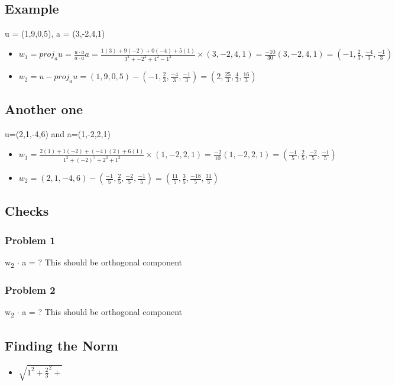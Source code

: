 \documentclass[11pt]{article}
\begin{document}
\subsection{Example}
\label{sec:org89458b6}
u = (1,9,0,5), a = (3,-2,4,1)
\begin{itemize}
\item \(w_{1} = proj_{a}u = \frac{u\cdot{}a}{a\cdot{}a}a = \frac{1(3)+9(-2)+0(-4)+5(1)}{3^{2}+-2^{2}+4^{2}-1^{2}} \times{} (3,-2,4,1) = \frac{-10}{30}(3,-2,4,1) = (-1, \frac{2}{3}, \frac{-4}{3}, \frac{-1}{3})\)
\item \(w_{2} = u - proj_{a}u = (1,9,0,5) - (-1, \frac{2}{3}, \frac{-4}{3}, \frac{-1}{3}) = (2, \frac{25}{3}, \frac{4}{3}, \frac{16}{3})\)
\end{itemize}
\subsection{Another one}
\label{sec:org9aed090}
u=(2,1,-4,6) and a=(1,-2,2,1)
\begin{itemize}
\item \(w_{1} = \frac{2(1)+1(-2)+(-4)(2)+6(1)}{1^{2}+(-2)^{2}+2^{2}+1^{2}} \times{} (1,-2,2,1) = \frac{-2}{10}(1,-2,2,1) = (\frac{-1}{5},\frac{2}{5},\frac{-2}{5},\frac{-1}{5})\)
\item \(w_{2} = (2,1,-4,6) - (\frac{-1}{5},\frac{2}{5},\frac{-2}{5},\frac{-1}{5}) = (\frac{11}{5}, \frac{3}{5}, \frac{-18}{5}, \frac{31}{5})\)
\end{itemize}
\subsection{Checks}
\label{sec:org357124f}
\subsubsection{Problem 1}
\label{sec:org5aadb64}
w\textsubscript{2} \(\cdot\) a = ?
This should be orthogonal component
\subsubsection{Problem 2}
\label{sec:org6a78856}
w\textsubscript{2} \(\cdot\) a = ?
This should be orthogonal component
\subsection{Finding the Norm}
\label{sec:org13c5902}
\begin{itemize}
\item \(\sqrt{1^2 + \frac{2}{3}^{2} + }\)
\end{itemize}
\end{document}
